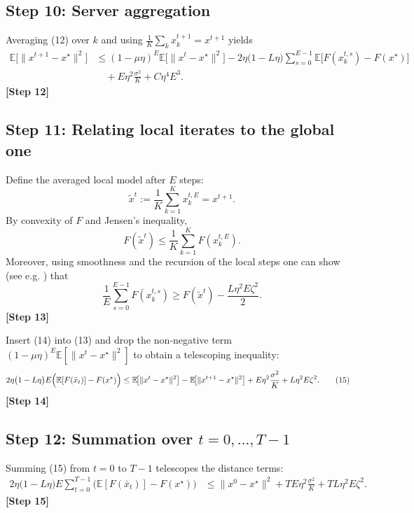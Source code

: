 \documentclass[11pt]{article}
\begin{document}
\subsection*{Step 10: Server aggregation}
Averaging (12) over $k$ and using $\frac{1}{K}\sum_{k}x_{k}^{t+1}=x^{t+1}$ yields
\begin{align}
    \mathbb{E}\!\bigl[\|x^{t+1}-x^{\star}\|^{2}\bigr]
    &\le (1-\mu\eta)^{E}\mathbb{E}\!\bigl[\|x^{t}-x^{\star}\|^{2}\bigr]
       -2\eta\bigl(1-L\eta\bigr)\sum_{s=0}^{E-1}\mathbb{E}\!\bigl[F(x_{k}^{t,s})-F(x^{\star})\bigr]\nonumber\\
    &\quad +E\eta^{2}\frac{\sigma^{2}}{K}+C\eta^{4}E^{3}. \tag{13}
\end{align}
\textbf{[Step 12]}

\subsection*{Step 11: Relating local iterates to the global one}
Define the averaged local model after $E$ steps:
\[
    \tilde{x}^{t}:=\frac{1}{K}\sum_{k=1}^{K}x_{k}^{t,E}=x^{t+1}.
\]
By convexity of $F$ and Jensen’s inequality,
\[
    F(\tilde{x}^{t})\le\frac{1}{K}\sum_{k=1}^{K}F(x_{k}^{t,E}).
\]
Moreover, using smoothness and the recursion of the local steps one can show (see e.g. \cite{li2020federated}) that
\[
    \frac{1}{E}\sum_{s=0}^{E-1}F(x_{k}^{t,s})
    \ge F(\tilde{x}^{t})-\frac{L\eta^{2}E\zeta^{2}}{2}. \tag{14}
\]
\textbf{[Step 13]}

Insert (14) into (13) and drop the non‑negative term $(1-\mu\eta)^{E}\mathbb{E}[\|x^{t}-x^{\star}\|^{2}]$ to obtain a telescoping inequality:
\begin{align}
    2\eta\bigl(1-L\eta\bigr)E\Bigl(\mathbb{E}[F(\bar{x}_{t})]-F(x^{\star})\Bigr)
    &\le \mathbb{E}\!\bigl[\|x^{t}-x^{\star}\|^{2}\bigr]
       -\mathbb{E}\!\bigl[\|x^{t+1}-x^{\star}\|^{2}\bigr]
       +E\eta^{2}\frac{\sigma^{2}}{K}+L\eta^{2}E\zeta^{2}. \tag{15}
\end{align}
\textbf{[Step 14]}

\subsection*{Step 12: Summation over $t=0,\dots,T-1$}
Summing (15) from $t=0$ to $T-1$ telescopes the distance terms:
\begin{align}
    2\eta\bigl(1-L\eta\bigr)E\sum_{t=0}^{T-1}\bigl(\mathbb{E}[F(\bar{x}_{t})]-F(x^{\star})\bigr)
    &\le \|x^{0}-x^{\star}\|^{2}
       +T E\eta^{2}\frac{\sigma^{2}}{K}+T L\eta^{2}E\zeta^{2}. \tag{16}
\end{align}
\textbf{[Step 15]}
\end{document}
